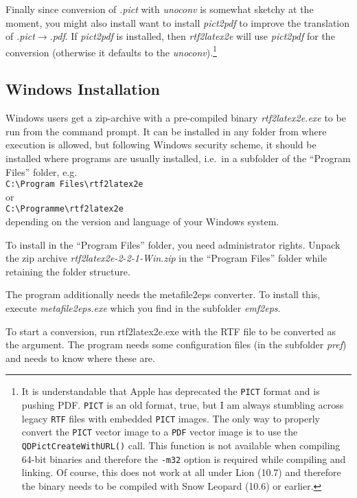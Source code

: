 \documentclass{article}
\def\rtf2latex2e{{\it rtf2latex2e}}
\begin{document}
Finally since conversion of \textit{.pict} with \textit{unoconv} is somewhat
sketchy at the moment, you might also install want to install \textit{pict2pdf}
to improve the translation of \textit{.pict}$\rightarrow$\textit{.pdf}.
If \textit{pict2pdf} is installed, then {\rtf2latex2e} will use \textit{pict2pdf} for
the conversion (otherwise it defaults to
the \textit{unoconv}).\footnote{It is understandable that Apple has deprecated the \texttt{PICT} format
and is pushing PDF. \texttt{PICT} is an old format, true, but I am always stumbling
across legacy \texttt{RTF} files with embedded \texttt{PICT} images. The only
way to properly convert the \texttt{PICT} vector image to a \texttt{PDF} vector
image is to use the \texttt{QDPictCreateWithURL()} call. This function is not
available when compiling 64-bit binaries and therefore the \texttt{-m32} option
is required while compiling and linking. Of course, this does not work at all
under Lion (10.7) and therefore the binary needs to be compiled with Snow
Leopard (10.6) or earlier.} 

\subsection{Windows Installation}
Windows users get a zip-archive with a pre-compiled binary
\textit{rtf2latex2e.exe} to be run from the command prompt.
It can be installed in any folder from where execution is allowed, but
following Windows security scheme, it should be installed where
programs are usually installed, i.e.\ in a subfolder of the
``Program Files'' folder, e.g.\\
\verb|C:\Program Files\rtf2latex2e|\\
or\\
\verb|C:\Programme\rtf2latex2e|\\
depending on the version and language of your Windows system.

To install in the ``Program Files'' folder, you need administrator rights.
Unpack the zip archive \textit{rtf2latex2e-2-2-1-Win.zip} in the ``Program Files''
folder while retaining the folder structure.

The program additionally needs the metafile2eps converter. To install this, 
execute \textit{metafile2eps.exe} which you find in the subfolder \textit{emf2eps}.

To start a conversion, run rtf2latex2e.exe with the RTF file to be converted
as the argument. The program needs some configuration files (in the
subfolder \textit{pref}) and needs to know where these are.
\end{document}
